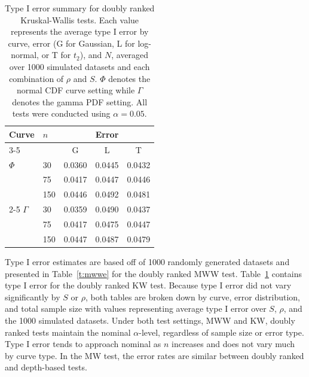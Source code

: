 \documentclass[12pt]{article}
\theoremstyle{plain}
\begin{document}
\begin{table}
\centering
\caption{Type I error summary for doubly ranked Kruskal-Wallis tests. Each value represents the average type I error by curve, error (G for Gaussian, L for log-normal, or T for $t_2$), and $N$, averaged over 1000 simulated datasets and each combination of $\rho$ and $S$. $\Phi$ denotes the normal CDF curve setting while $\Gamma$ denotes the gamma PDF setting. All tests were conducted using $\alpha = 0.05$.  \label{t:kwe}}
\vspace{5pt}
\begin{tabular}{llccc}
  \hline
\multirow{2}{*}{Curve} & \multirow{2}{*}{$n$} &  \multicolumn{3}{c}{Error} \\
  \cline{3-5}
   &  & G &  L & T \\ 
  \hline
$\Phi$ &  30 & 0.0360 & 0.0445 & 0.0432 \\
 & 75 & 0.0417 & 0.0447 & 0.0446 \\
 & 150 & 0.0446 & 0.0492 & 0.0481 \\
\cline{2-5}
$\Gamma$ &  30 & 0.0359 & 0.0490 & 0.0437 \\
 & 75 & 0.0417 & 0.0475 & 0.0447 \\
 & 150 & 0.0447 & 0.0487 & 0.0479 \\
    \hline
\end{tabular}
\end{table}

	Type I error estimates are based off of 1000 randomly generated datasets and presented in Table~\ref{t:mwwe} for the doubly ranked MWW test. Table~\ref{t:kwe} contains type I error for the doubly ranked KW test. Because type I error did not vary significantly by $S$ or $\rho$, both tables are broken down by curve, error distribution, and total sample size with values representing average type I error over $S$, $\rho$, and the 1000 simulated datasets. Under both test settings, MWW and KW, doubly ranked tests maintain the nominal $\alpha$-level, regardless of sample size or error type. Type I error tends to approach nominal as $n$ increases and does not vary much by curve type. In the MW test, the error rates are similar between doubly ranked and depth-based tests.
\end{document}
